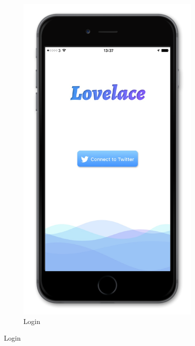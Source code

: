 \documentclass{article}
\begin{document}
\begin{figure}[H]
\begin{subfigure}[b]{0.48\textwidth}
        \includegraphics[width=\textwidth]{iphone_2_login}
        \caption{Login}
    \end{subfigure}
    
    \vspace{1em}
    

\end{figure}
\end{document}
